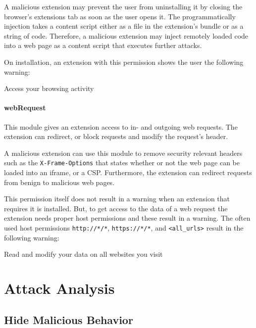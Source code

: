 	A malicious extension may prevent the user from uninstalling it by closing the browser's extensions tab as soon as the user opens it. The programmatically injection takes a content script either as a file in the extension's bundle or as a string of code. Therefore, a malicious extension may inject remotely loaded code into a web page as a content script that executes further attacks.
	
	On installation, an extension with this permission shows the user the following warning:
	\begin{permissionwarning}
		Access your browsing activity 
	\end{permissionwarning}		

\paragraph{webRequest}
	This module gives an extension access to in- and outgoing web requests. The extension can redirect, or block requests and modify the request's header.
	
	A malicious extension can use this module to remove security relevant headers such as the \texttt{X-Frame-Options} that states whether or not the web page can be loaded into an iframe, or a CSP. Furthermore, the extension can redirect requests from benign to malicious web pages.

	This permission itself does not result in a warning when an extension that requires it is installed. But, to get access to the data of a web request the extension needs proper host permissions and these result in a warning. The often used host permissions \texttt{http://*/*}, \texttt{https://*/*}, and \texttt{<all\_urls>} result in the following warning:
	\begin{permissionwarning}
		Read and modify your data on all websites you visit 
	\end{permissionwarning}
	
	
	
\section{Attack Analysis} %



\subsection{Hide Malicious Behavior} %
	
